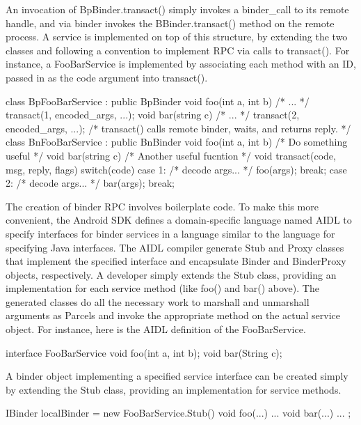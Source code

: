 \documentclass[prodmode]{acmlarge}
\begin{document}
An invocation of BpBinder.transact() simply invokes a binder\_call to its remote handle, and via binder invokes the BBinder.transact() method on the remote process. A service is implemented on top of this structure, by extending the two classes and following a convention to implement RPC via calls to transact(). For instance, a FooBarService is implemented by associating each method with an ID, passed in as the code argument into transact().

\begin{snippet}
class BpFooBarService : public BpBinder {
  void foo(int a, int b) { /* ... */ transact(1, encoded_args, ...); }
  void bar(string c) { /* ... */ transact(2, encoded_args, ...); }
  /* transact() calls remote binder, waits, and returns reply. */
}
class BnFooBarService : public BnBinder {
  void foo(int a, int b) { /* Do something useful */ }
  void bar(string c) { /* Another useful fucntion */ }
  void transact(code, msg, reply, flags) {
    switch(code) {
      case 1: /* decode args... */ foo(args); break;
      case 2: /* decode args... */ bar(args); break;
}}}
\end{snippet}

The creation of binder RPC involves boilerplate code. To make this more convenient, the Android SDK defines a domain-specific language named AIDL to specify interfaces for binder services in a language similar to the language for specifying Java interfaces. The AIDL compiler generate Stub and Proxy classes that implement the specified interface and encapsulate Binder and BinderProxy objects, respectively. A developer simply extends the Stub class, providing an implementation for each service method (like foo() and bar() above). The generated classes do all the necessary work to marshall and unmarshall arguments as Parcels and invoke the appropriate method on the actual service object. For instance, here is the AIDL definition of the FooBarService.

\begin{snippet}
interface FooBarService { void foo(int a, int b); void bar(String c); }
\end{snippet}

A binder object implementing a specified service interface can be created simply by extending the Stub class, providing an implementation for service methods.

\begin{snippet}
IBinder localBinder = new FooBarService.Stub() { void foo(...) { ... }
                                                 void bar(...) { ... } };
\end{snippet}
\end{document}
